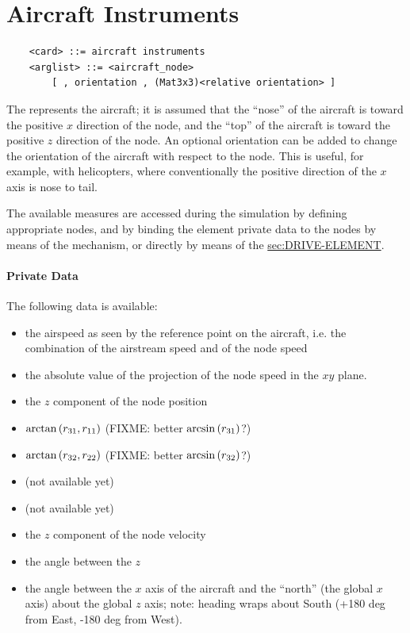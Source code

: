 \section{Aircraft Instruments}
\begin{verbatim}
    <card> ::= aircraft instruments
    <arglist> ::= <aircraft_node>
        [ , orientation , (Mat3x3)<relative orientation> ]
\end{verbatim}
The  represents the aircraft; it is assumed
that the ``nose'' of the aircraft is toward the positive $x$ direction
of the node, and the ``top'' of the aircraft is toward the positive 
$z$ direction of the node.
An optional orientation can be added to change the orientation 
of the aircraft with respect to the node.
This is useful, for example, with helicopters, where conventionally
the positive direction of the $x$ axis is nose to tail.

The available measures are accessed during the simulation 
by defining appropriate  nodes, and by binding
the  element private data to the nodes 
by means of the  mechanism, or directly by means
of the 
\hyperref{\kw{element} drive}{\kw{element} drive (see Section~}{)}{sec:DRIVE-ELEMENT}.

\paragraph{Private Data}
The following data is available:
\begin{itemize}
\item {} the airspeed as seen by the reference 
	point on the aircraft, i.e. the combination 
	of the airstream speed and of the node speed
\item {} the absolute value of the projection
	of the node speed in the $xy$ plane.
\item {} the $z$ component of the node position
\item {} $\arctan\left( r_{31}, r_{11} \right)$
	(FIXME: better $\arcsin\left( r_{31} \right)$?)
\item {} $\arctan\left( r_{32}, r_{22} \right)$
	(FIXME: better $\arcsin\left( r_{32} \right)$?)
\item {} (not available yet)
\item {} (not available yet)
\item {} the $z$ component of the node velocity
\item {} the angle between the $z$ 
\item {} the angle between the $x$ axis of the aircraft 
	and the ``north'' (the global $x$ axis) about the global $z$ axis;
	note: heading wraps about South
	(+180 deg from East, -180 deg from West).
\end{itemize}

